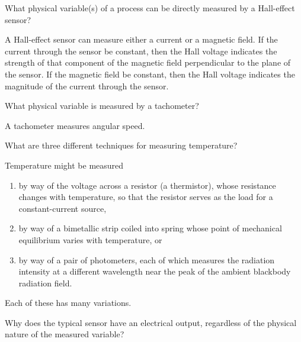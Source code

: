 \begin{problem}
   What physical variable(s) of a process can be directly measured by a
   Hall-effect sensor?
\end{problem}

\begin{solution}
   A Hall-effect sensor can measure either a current or a magnetic field. If
   the current through the sensor be constant, then the Hall voltage indicates
   the strength of that component of the magnetic field perpendicular to the
   plane of the sensor. If the magnetic field be constant, then the Hall
   voltage indicates the magnitude of the current through the sensor.
\end{solution}

\begin{problem}
   What physical variable is measured by a tachometer?
\end{problem}

\begin{solution}
   A tachometer measures angular speed.
\end{solution}

\begin{problem}
   What are three different techniques for measuring temperature?
\end{problem}

\begin{solution}
   Temperature might be measured
   \begin{enumerate}
      \item by way of the voltage across a resistor (a thermistor), whose
         resistance changes with temperature, so that the resistor serves as
         the load for a constant-current source,
      \item by way of a bimetallic strip coiled into spring whose point of
         mechanical equilibrium varies with temperature, or
      \item by way of a pair of photometers, each of which measures the
         radiation intensity at a different wavelength near the peak of the
         ambient blackbody radiation field.
   \end{enumerate}
   Each of these has many variations.
\end{solution}

\begin{problem}
   Why does the typical sensor have an electrical output, regardless of the
   physical nature of the measured variable?
\end{problem}

